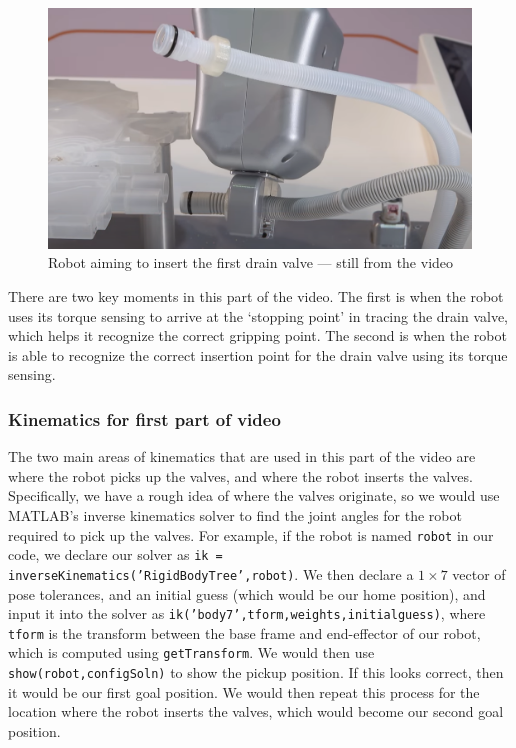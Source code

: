 \documentclass[conference]{IEEEtran}
\begin{document}
\begin{figure}[h!]
    \centering
    \includegraphics[scale=0.15]{kuka-drain-valve-insertion.png}
    \caption{Robot aiming to insert the first drain valve --- still from the video}
    \label{kuka-drain-valve-insertion}
\end{figure}

There are two key moments in this part of the video. The first is when the robot
uses its torque sensing to arrive at the `stopping point' in tracing the drain
valve, which helps it recognize the correct gripping point. The second is when
the robot is able to recognize the correct insertion point for the drain valve
using its torque sensing.

\subsubsection{Kinematics for first part of video}

The two main areas of kinematics that are used in this part of the video are
where the robot picks up the valves, and where the robot inserts the valves.
Specifically, we have a rough idea of where the valves originate, so we would
use MATLAB's inverse kinematics solver to find the joint angles for the robot
required to pick up the valves. For example, if the robot is named \texttt{robot} 
in our code, we declare our solver as \texttt{ik = inverseKinematics('RigidBodyTree',robot)}.
We then declare a $1 \times 7$ vector of pose tolerances, and an initial guess (which
would be our home position), and input it into the solver as \texttt{ik('body7',tform,weights,initialguess)},
where \texttt{tform} is the transform between the base frame and end-effector of our
robot, which is computed using \texttt{getTransform}. We would then use
\texttt{show(robot,configSoln)} to show the pickup position. If this looks correct,
then it would be our first goal position. We would then repeat this process for the
location where the robot inserts the valves, which would become our second goal position.
\end{document}
